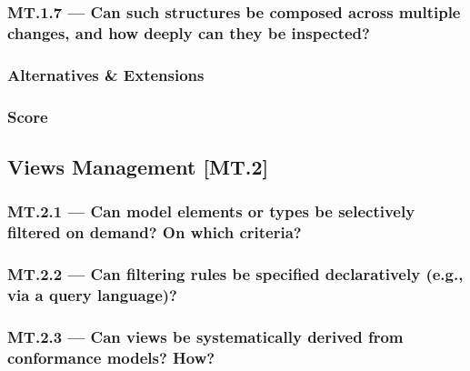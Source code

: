 \documentclass[sigconf]{acmart}
\begin{document}
\subsubsection*{MT.1.7 --- Can such structures be composed across multiple changes, and how deeply can they be inspected?}
\label{sec:MT1-7}



\subsubsection*{Alternatives \& Extensions}
\label{sec:MT1-Alternatives-Extensions}


\subsubsection*{Score}
\label{sec:MT1-Score}



\subsection{Views Management [MT.2]}
\label{sec:MT2}

\subsubsection*{MT.2.1 --- Can model elements or types be selectively filtered on demand? On which criteria?}
\label{sec:MT2-1}



\subsubsection*{MT.2.2 --- Can filtering rules be specified declaratively (e.g., via a query language)?}
\label{sec:MT2-2}



\subsubsection*{MT.2.3 --- Can views be systematically derived from conformance models? How?}
\label{sec:MT2-3}
\end{document}
